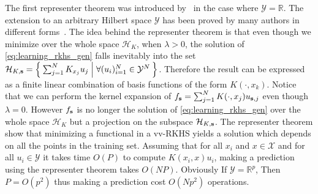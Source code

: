 \documentclass[twoside,11pt]{article}
\begin{document}
The first representer theorem was introduced by~\citet{Wahba90} in the case
where $\mathcal{Y}=\mathbb{R}$. The extension to an arbitrary Hilbert space
$\mathcal{Y}$ has been proved by many authors in different
forms~\citep{Brouard2011,kadri2015operator,Micchelli2005}. The idea behind the
representer theorem is that even though we minimize over the whole space
$\mathcal{H}_K$, when $\lambda>0$, the solution of \cref{eq:learning_rkhs_gen}
falls inevitably into the set $\mathcal{H}_{K,
\boldsymbol{\mathbf{s}}}=\Set{\sum_{j=1}^{N}K_{x_j}u_j| \forall (u_i)_{i=1}^{N}
\in\mathcal{Y}^{N}}$.  Therefore the result can be expressed as a finite linear
combination of basis functions of the form $K(\cdot,x_k)$. Notice that we can
perform the kernel expansion of
$f_{\boldsymbol{\mathbf{s}}}=\sum_{j=1}^{N}K(\cdot,x_j)u_{\boldsymbol{\mathbf{s}},j}$ even though $\lambda=0$.
However $f_{\boldsymbol{\mathbf{s}}}$ is no longer the solution of \cref{eq:learning_rkhs_gen}
over the whole space $\mathcal{H}_K$ but a projection on the subspace
$\mathcal{H}_{K, \boldsymbol{\mathbf{s}}}$. 
The representer theorem show that minimizing a
functional in a \acs{vv-RKHS} yields a solution which depends on all the points
in the training set. Assuming that for all $x_i$ and $x\in\mathcal{X}$ and for
all $u_i\in\mathcal{Y}$ it takes time $O(P)$ to compute $K(x_i, x)u_i$, making
a prediction using the representer theorem takes $O(NP)$. Obviously If
$\mathcal{Y}=\mathbb{R}^p$, Then $P=O(p^2)$ thus making a prediction cost
$O(Np^2)$ operations.
\end{document}
